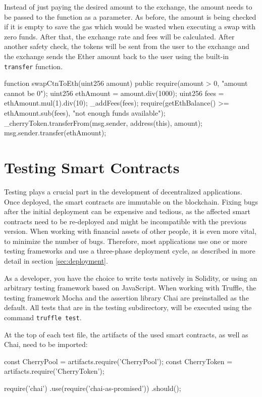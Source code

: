 Instead of just paying the desired amount to the exchange, the amount needs to be passed to the function as a parameter. As before, the amount is being checked if it is empty to save the gas which would be wasted when executing a swap with zero funds. After that, the exchange rate and fees will be calculated. After another safety check, the tokens will be sent from the user to the exchange and the exchange sends the Ether amount back to the user using the built-in \texttt{transfer} function.

\begin{GenericCode}
  function swapCtnToEth(uint256 amount) public {
    require(amount > 0, "amount cannot be 0");
    uint256 ethAmount = amount.div(1000);
    uint256 fees = ethAmount.mul(1).div(10);
    _addFees(fees);
    require(getEthBalance() >= ethAmount.sub(fees), "not enough funds available");
    _cherryToken.transferFrom(msg.sender, address(this), amount);
    msg.sender.transfer(ethAmount);
  }	
\end{GenericCode}

\section{Testing Smart Contracts}
Testing plays a crucial part in the development of decentralized applications. Once deployed, the smart contracts are immutable on the blockchain. Fixing bugs after the initial deployment can be expensive and tedious, as the affected smart contracts need to be re-deployed and might be incompatible with the previous version. When working with financial assets of other people, it is even more vital, to minimize the number of bugs. Therefore, most applications use one or more testing frameworks and use a three-phase deployment cycle, as described in more detail in section \ref{sec:deployment}.

As a developer, you have the choice to write tests natively in Solidity, or using an arbitrary testing framework based on JavaScript. When working with Truffle, the testing framework Mocha\cite{Mocha} and the assertion library Chai\cite{Chai} are preinstalled as the default. All tests that are in the testing subdirectory, will be executed using the command \texttt{truffle test}.

At the top of each test file, the artifacts of the used smart contracts, as well as Chai, need to be imported:
\begin{GenericCode}
const CherryPool = artifacts.require('CherryPool');
const CherryToken = artifacts.require('CherryToken');

require('chai')
  .use(require('chai-as-promised'))
  .should();	
\end{GenericCode}

